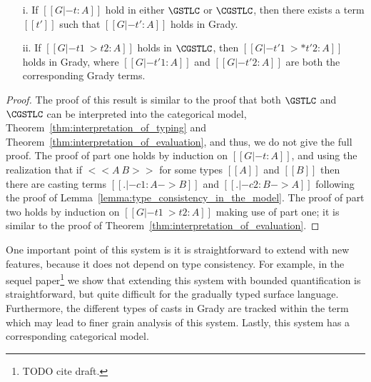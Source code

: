 \begin{lemma}[Translations]
  \label{lemma:translations}
  \begin{center}
    \begin{itemize}
    \item[] 
    \item[i.] If $[[G |- t : A]]$ hold in either $\GSTLC$ or
      $\CGSTLC$, then there exists a term
      $[[t']]$ such that $[[G |- t' : A]]$ holds in Grady.
    \item[ii.] If $[[G |- t1 ~> t2 : A]]$ holds in $\CGSTLC$, then
      $[[G |- t'1 ~>* t'2 : A]]$ holds in Grady, where $[[G |- t'1 :
        A]]$ and $[[G |- t'2 : A]]$ are both the corresponding Grady
      terms.
    \end{itemize}
  \end{center}
\end{lemma}
\begin{proof}
  The proof of this result is similar to the proof that both
  $\GSTLC$ and $\CGSTLC$ can be
  interpreted into the categorical model,
  Theorem~\ref{thm:interpretation_of_typing} and
  Theorem~\ref{thm:interpretation_of_evaluation}, and thus, we do not
  give the full proof.  The proof of part one holds by induction on
  $[[G |- t : A]]$, and using the realization that if $<<A ~ B>>$ for
  some types $[[A]]$ and $[[B]]$ then there are casting terms $[[. |-
      c1 : A -> B]]$ and $[[. |- c2 : B -> A]]$ following the proof of
  Lemma~\ref{lemma:type_consistency_in_the_model}. The proof of part
  two holds by induction on $[[G |- t1 ~> t2 : A]]$ making use of part
  one; it is similar to the proof of
  Theorem~\ref{thm:interpretation_of_evaluation}.
\end{proof}

One important point of this system is it is straightforward to extend
with new features, because it does not depend on type consistency.
For example, in the sequel paper\footnote{TODO cite draft.} we show
that extending this system with bounded quantification is
straightforward, but quite difficult for the gradually typed surface
language.  Furthermore, the different types of casts in Grady are
tracked within the term which may lead to finer grain analysis of this
system.  Lastly, this system has a corresponding categorical model.

